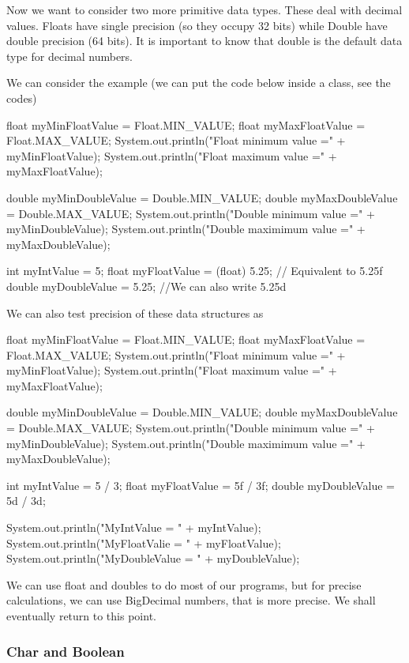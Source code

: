 Now we want to consider two more primitive data types. These deal with decimal values. Floats have 
single precision (so they occupy 32 bits) while Double have double precision (64 bits). 
It is important to know that double is the default data type for decimal numbers.

We can consider the example (we can put the code below inside a class, see the codes) 
\begin{listing}{1}
      float myMinFloatValue = Float.MIN_VALUE;
      float myMaxFloatValue = Float.MAX_VALUE;
      System.out.println("Float minimum value =" + myMinFloatValue);
      System.out.println("Float maximum value =" + myMaxFloatValue);

      double myMinDoubleValue = Double.MIN_VALUE;
      double myMaxDoubleValue = Double.MAX_VALUE;
      System.out.println("Double minimum value =" + myMinDoubleValue);
      System.out.println("Double maximimum value =" + myMaxDoubleValue);

      int myIntValue = 5;
      float myFloatValue = (float) 5.25; // Equivalent to 5.25f
      double myDoubleValue = 5.25; //We can also write 5.25d
\end{listing}
We can also test precision of these data structures as 
\begin{listing}{1}
      float myMinFloatValue = Float.MIN_VALUE;
      float myMaxFloatValue = Float.MAX_VALUE;
      System.out.println("Float minimum value =" + myMinFloatValue);
      System.out.println("Float maximum value =" + myMaxFloatValue);

      double myMinDoubleValue = Double.MIN_VALUE;
      double myMaxDoubleValue = Double.MAX_VALUE;
      System.out.println("Double minimum value =" + myMinDoubleValue);
      System.out.println("Double maximimum value =" + myMaxDoubleValue);

      int myIntValue = 5 / 3;
      float myFloatValue = 5f / 3f;
      double myDoubleValue = 5d / 3d;

      System.out.println("MyIntValue = " + myIntValue);
      System.out.println("MyFloatValie = " + myFloatValue);
      System.out.println("MyDoubleValue = " + myDoubleValue);
\end{listing}

We can use float and doubles to do most of our programs, but for precise calculations, we can use
BigDecimal numbers, that is more precise. We shall eventually return to this point. 


\subsubsection{Char and Boolean}

